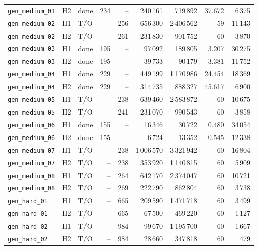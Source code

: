 \begin{tabular}{lllrrrrrr}
\texttt{gen\_medium\_01} & H2 & done & 234 & -- & 240\,161 & 719\,892 & 37.672 & 6\,375 \\
\texttt{gen\_medium\_02} & H1 & T/O & -- & 256 & 656\,300 & 2\,406\,562 & 59 & 11\,143 \\
\texttt{gen\_medium\_02} & H2 & T/O & -- & 261 & 231\,830 & 901\,752 & 60 & 3\,870 \\
\texttt{gen\_medium\_03} & H1 & done & 195 & -- & 97\,092 & 189\,805 & 3.207 & 30\,275 \\
\texttt{gen\_medium\_03} & H2 & done & 195 & -- & 39\,733 & 90\,179 & 3.381 & 11\,752 \\
\texttt{gen\_medium\_04} & H1 & done & 229 & -- & 449\,199 & 1\,170\,986 & 24.454 & 18\,369 \\
\texttt{gen\_medium\_04} & H2 & done & 229 & -- & 314\,735 & 888\,327 & 45.617 & 6\,900 \\
\texttt{gen\_medium\_05} & H1 & T/O & -- & 238 & 639\,460 & 2\,583\,872 & 60 & 10\,675 \\
\texttt{gen\_medium\_05} & H2 & T/O & -- & 241 & 231\,070 & 990\,543 & 60 & 3\,858 \\
\texttt{gen\_medium\_06} & H1 & done & 155 & -- & 16\,346 & 30\,722 & 0.480 & 34\,054 \\
\texttt{gen\_medium\_06} & H2 & done & 155 & -- & 6\,724 & 13\,352 & 0.545 & 12\,338 \\
\texttt{gen\_medium\_07} & H1 & T/O & -- & 238 & 1\,006\,570 & 3\,321\,942 & 60 & 16\,804 \\
\texttt{gen\_medium\_07} & H2 & T/O & -- & 238 & 353\,920 & 1\,140\,815 & 60 & 5\,909 \\
\texttt{gen\_medium\_08} & H1 & T/O & -- & 264 & 642\,170 & 2\,374\,047 & 60 & 10\,721 \\
\texttt{gen\_medium\_08} & H2 & T/O & -- & 269 & 222\,790 & 862\,804 & 60 & 3\,738 \\
\texttt{gen\_hard\_01} & H1 & T/O & -- & 665 & 209\,590 & 1\,471\,718 & 60 & 3\,499 \\
\texttt{gen\_hard\_01} & H2 & T/O & -- & 665 & 67\,500 & 469\,220 & 60 & 1\,127 \\
\texttt{gen\_hard\_02} & H1 & T/O & -- & 984 & 99\,670 & 1\,195\,700 & 60 & 1\,667 \\
\texttt{gen\_hard\_02} & H2 & T/O & -- & 984 & 28\,660 & 347\,818 & 60 & 479 \\
\bottomrule
\end{tabular}
